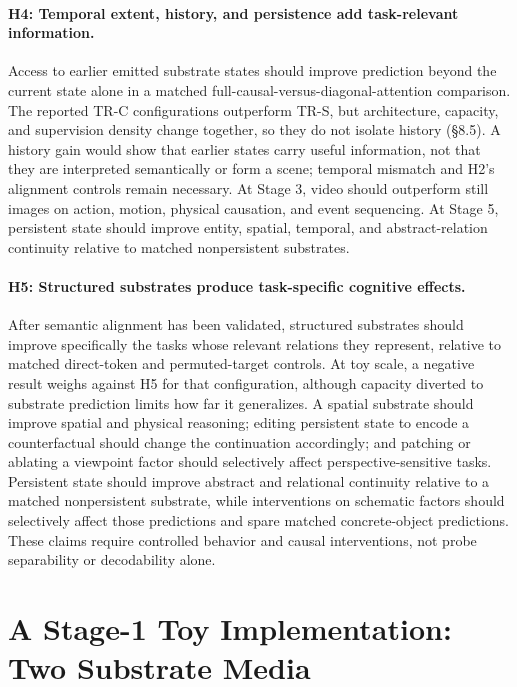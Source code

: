 \documentclass[11pt,a4paper]{article}
\begin{document}
\paragraph{H4: Temporal extent, history, and persistence add task-relevant information.} Access to earlier emitted substrate states should improve prediction beyond the current state alone in a matched full-causal-versus-diagonal-attention comparison. The reported TR-C configurations outperform TR-S, but architecture, capacity, and supervision density change together, so they do not isolate history (§8.5). A history gain would show that earlier states carry useful information, not that they are interpreted semantically or form a scene; temporal mismatch and H2's alignment controls remain necessary. At Stage 3, video should outperform still images on action, motion, physical causation, and event sequencing. At Stage 5, persistent state should improve entity, spatial, temporal, and abstract-relation continuity relative to matched nonpersistent substrates.

\paragraph{H5: Structured substrates produce task-specific cognitive effects.} After semantic alignment has been validated, structured substrates should improve specifically the tasks whose relevant relations they represent, relative to matched direct-token and permuted-target controls. At toy scale, a negative result weighs against H5 for that configuration, although capacity diverted to substrate prediction limits how far it generalizes. A spatial substrate should improve spatial and physical reasoning; editing persistent state to encode a counterfactual should change the continuation accordingly; and patching or ablating a viewpoint factor should selectively affect perspective-sensitive tasks. Persistent state should improve abstract and relational continuity relative to a matched nonpersistent substrate, while interventions on schematic factors should selectively affect those predictions and spare matched concrete-object predictions. These claims require controlled behavior and causal interventions, not probe separability or decodability alone.

\section{A Stage-1 Toy Implementation: Two Substrate Media}
\end{document}
